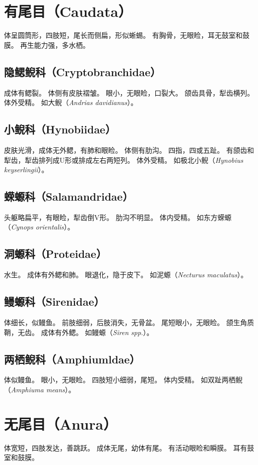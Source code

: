 \documentclass[11pt]{article}
\begin{document}
\section{有尾目（Caudata）}
体呈圆筒形，四肢短，尾长而侧扁，形似蜥蜴。
有胸骨，无眼睑，耳无鼓室和鼓膜。
再生能力强，多水栖。

\subsection{隐鳃鲵科（Cryptobranchidae）}
成体有鳃裂。
体侧有皮肤褶皱。
眼小，无眼睑，口裂大。
颌齿具骨，犁齿横列。
体外受精。
如大鲵（\textit{Andrias davidianus}）。

\subsection{小鲵科（Hynobiidae）}
皮肤光滑，成体无外鳃，有肺和眼睑。
体侧有肋沟。
四指，四或五趾。
有颌齿和犁齿，犁齿排列成U形或排成左右两短列。
体外受精。
如极北小鲵（\textit{Hynobius keyserlingii}）。

\subsection{蝾螈科（Salamandridae）}
头躯略扁平，有眼睑，犁齿倒V形。
肋沟不明显。
体内受精。
如东方蝾螈（\textit{Cynops orientalis}）。

\subsection{洞螈科（Proteidae）}
水生。
成体有外鳃和肺。
眼退化，隐于皮下。
如泥螈（\textit{Necturus maculatus}）。

\subsection{鳗螈科（Sirenidae）}
体细长，似鳗鱼。
前肢细弱，后肢消失，无骨盆。
尾短眼小，无眼睑。
颌生角质鞘，无齿。
成体有外鳃。
如鳗螈（\textit{Siren spp.}）。

\subsection{两栖鲵科（Amphiumldae）}
体似鳗鱼。
眼小，无眼睑。
四肢短小细弱，尾短。
体内受精。
如双趾两栖鲵（\textit{Amphiuma means}）。

\section{无尾目（Anura）}
体宽短，四肢发达，善跳跃。
成体无尾，幼体有尾。
有活动眼睑和瞬膜。
耳有鼓室和鼓膜。
\end{document}
